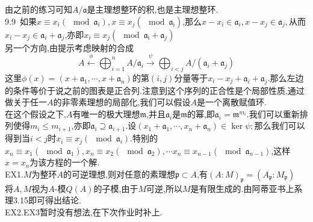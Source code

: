 \documentclass[b5paper]{ctexart}
\begin{document}
由之前的练习可知$A/\mathfrak{a}$是主理想整环的积,也是主理想整环.\\
9.9~如果$x\equiv x_i(\mod {\mathfrak{a}_i}),x\equiv x_j(\mod{\mathfrak{a_j}})$,那么$x-x_i\in\mathfrak{a}_i,x-x_j\in\mathfrak{a}_j,$从而$x_i-x_j\in\mathfrak{a}_i+\mathfrak{a}_j$,亦即$x_i\equiv x_j(\mod{\mathfrak{a_i}+\mathfrak{a}_j})$\\
另一个方向,由提示考虑映射的合成
\[A\xleftarrow{\phi}\bigoplus_{i=1}^nA/\mathfrak{a}_i\xrightarrow{\psi}\bigoplus_{i<j}A/(\mathfrak{a}_i+\mathfrak{a}_j)\]
这里$\phi(x)=(x+\mathfrak{a}_1,\cdots,x+\mathfrak{a}_n)$的第$(i,j)$分量等于$x_i-x_j+\mathfrak{a}_i+\mathfrak{a}_j$.那么左边的条件等价于说之前的图表是正合列.注意到这个序列的正合性是个局部性质,通过做关于任一$A$的非零素理想的局部化,我们可以假设$A$是一个离散赋值环.\\
在这个假设之下,$A$有唯一的极大理想$\mathfrak{m}$,并且$\mathfrak{a}_i$是$\mathfrak{m}$的幂,即$\mathfrak{a}_i=\mathfrak{m}^{m_i}$.我们可以重新排列使得$m_i\leq m_{i+1}$,亦即$\mathfrak{a}_i\supseteq \mathfrak{a}_{i+1}$.设$(x_1+\mathfrak{a}_1,\cdots,x_n+\mathfrak{a}_n)\in\ker \psi;$那么我们可以得到当$i<j$时$x_i\equiv x_j(\mod{\mathfrak{a}_i})$.特别的$x_n\equiv x_1(\mod{\mathfrak{a}_1}),x_n\equiv x_2(\mod{\mathfrak{a}_2}),\cdots x_n\equiv x_{n-1}(\mod{\mathfrak{a}_{n-1}})$,这样$x=x_n$为该方程的一个解.\\
EX1.$M$为整环$A$的可逆理想,则对任意的素理想$\mathfrak{p}\subset A$,有$(A:M)_{\mathfrak{p}}=(A_{\mathfrak{p}}:M_{\mathfrak{p}})$\\
将$A,M$视为$A$-模$Q(A)$的子模,由于$M$可逆,所以$M$是有限生成的.由阿蒂亚书上系理3.15即可得出结论.\\
EX2.EX3暂时没有想法,在下次作业时补上.
\end{document}
